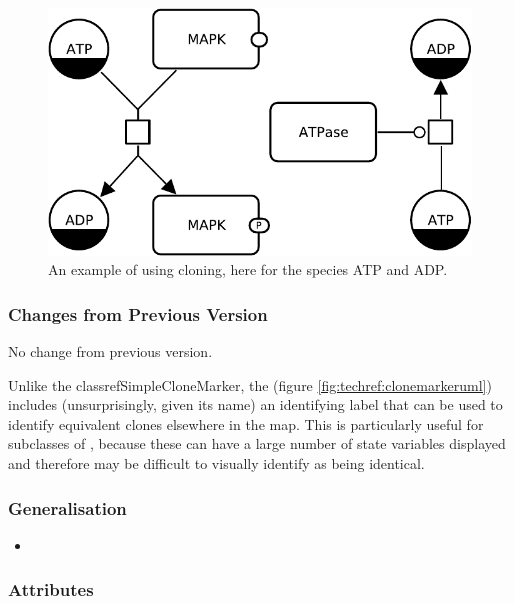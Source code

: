 \begin{figure}[htb]
  \centering
  \includegraphics[scale = 0.5]{examples/cloning}
  \caption{An example of using cloning, here for the species ATP and ADP.}
  \label{fig:techref:example-cloning}
\end{figure}

\subsubsection{Changes from Previous Version}

No change from previous version.


\label{defn:LabelledCloneMarker}

Unlike the classref{SimpleCloneMarker}, the
 (figure \ref{fig:techref:clonemarkeruml})
includes (unsurprisingly, given its name) an identifying label that
can be used to identify equivalent clones elsewhere in the map.  This
is particularly useful for subclasses of ,
because these can have a large number of state variables displayed and
therefore may be difficult to visually identify as being identical.

\subsubsection{Generalisation}

\begin{itemize}
\item {}
\end{itemize}

\subsubsection{Attributes}


